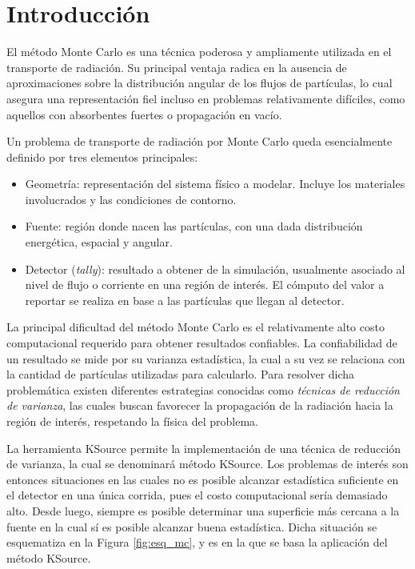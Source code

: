 \section{Introducción}

El método Monte Carlo es una técnica poderosa y ampliamente utilizada en el transporte de radiación. Su principal ventaja radica en la ausencia de aproximaciones sobre la distribución angular de los flujos de partículas, lo cual asegura una representación fiel incluso en problemas relativamente difíciles, como aquellos con absorbentes fuertes o propagación en vacío.

Un problema de transporte de radiación por Monte Carlo queda esencialmente definido por tres elementos principales:
\begin{itemize}
    \item Geometría: representación del sistema físico a modelar. Incluye los materiales involucrados y las condiciones de contorno.
    \item Fuente: región donde nacen las partículas, con una dada distribución energética, espacial y angular.
    \item Detector (\emph{tally}): resultado a obtener de la simulación, usualmente asociado al nivel de flujo o corriente en una región de interés. El cómputo del valor a reportar se realiza en base a las partículas que llegan al detector.
\end{itemize}

La principal dificultad del método Monte Carlo es el relativamente alto costo computacional requerido para obtener resultados confiables. La confiabilidad de un resultado se mide por su varianza estadística, la cual a su vez se relaciona con la cantidad de partículas utilizadas para calcularlo. Para resolver dicha problemática existen diferentes estrategias conocidas como \emph{técnicas de reducción de varianza}, las cuales buscan favorecer la propagación de la radiación hacia la región de interés, respetando la física del problema.

La herramienta KSource permite la implementación de una técnica de reducción de varianza, la cual se denominará método KSource. Los problemas de interés son entonces situaciones en las cuales no es posible alcanzar estadística suficiente en el detector en una única corrida, pues el costo computacional sería demasiado alto. Desde luego, siempre es posible determinar una superficie más cercana a la fuente en la cual sí es posible alcanzar buena estadística. Dicha situación se esquematiza en la Figura \ref{fig:esq_mc}, y es en la que se basa la aplicación del método KSource.

